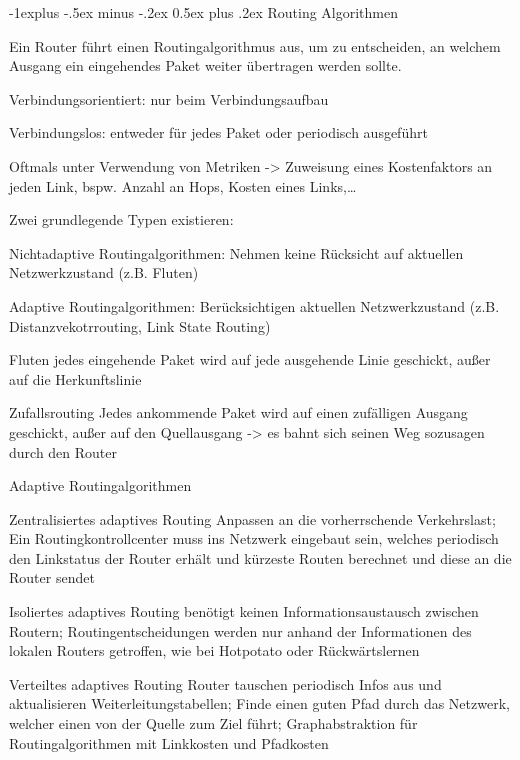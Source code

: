 \documentclass[10pt,landscape]{article}
\makeatletter
\renewcommand{\subsection}{\@startsection{subsection}{2}{0mm}%
                                {-1explus -.5ex minus -.2ex}%
                                {0.5ex plus .2ex}%
                                {\normalfont\normalsize\bfseries}}
\makeatother
\begin{document}
\begin{multicols}{3}
    \subsection{Routing Algorithmen}
    \begin{itemize*}
        \item Ein Router führt einen Routingalgorithmus aus, um zu entscheiden, an welchem Ausgang ein eingehendes Paket weiter übertragen werden sollte.
        \begin{itemize*}
            \item Verbindungsorientiert: nur beim Verbindungsaufbau
            \item Verbindungslos: entweder für jedes Paket oder periodisch ausgeführt
        \end{itemize*}
        \item Oftmals unter Verwendung von Metriken -> Zuweisung eines Kostenfaktors an jeden Link, bspw. Anzahl an Hops, Kosten eines Links,…
        \item Zwei grundlegende Typen existieren:
        \item \begin{itemize*}
            \item Nichtadaptive Routingalgorithmen: Nehmen keine Rücksicht auf aktuellen Netzwerkzustand (z.B. Fluten)
            \item Adaptive Routingalgorithmen: Berücksichtigen aktuellen Netzwerkzustand (z.B. Distanzvekotrrouting, Link State Routing)
        \end{itemize*}
    \end{itemize*}
    \begin{description*}
        \item[Fluten] jedes eingehende Paket wird auf jede ausgehende Linie geschickt, außer auf die Herkunftslinie
        \item[Zufallsrouting] Jedes ankommende Paket wird auf einen zufälligen Ausgang geschickt, außer auf den Quellausgang -> es bahnt sich seinen Weg sozusagen durch den Router
        \item[Adaptive Routingalgorithmen] \
        \begin{description*}
            \item[Zentralisiertes adaptives Routing] Anpassen an die vorherrschende Verkehrslast; Ein Routingkontrollcenter muss ins Netzwerk eingebaut sein, welches periodisch den Linkstatus der Router erhält und kürzeste Routen berechnet und diese an die Router sendet
            \item[Isoliertes adaptives Routing] benötigt keinen Informationsaustausch zwischen Routern; Routingentscheidungen werden nur anhand der Informationen des lokalen Routers getroffen, wie bei Hotpotato oder Rückwärtslernen
            \item[Verteiltes adaptives Routing] Router tauschen periodisch Infos aus und aktualisieren Weiterleitungstabellen; Finde einen guten Pfad durch das Netzwerk, welcher einen von der Quelle zum Ziel führt; Graphabstraktion für Routingalgorithmen mit Linkkosten und Pfadkosten
        \end{description*}
    \end{description*}
    

\end{multicols}
\end{document}
